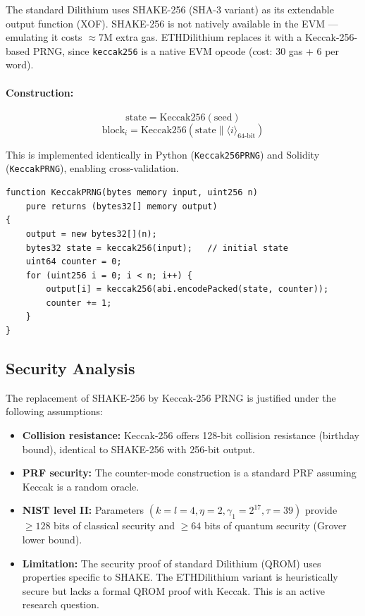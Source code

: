 \documentclass[11pt,a4paper]{article}
\begin{document}
The standard Dilithium uses SHAKE-256 (SHA-3 variant) as its extendable output function (XOF). SHAKE-256 is not natively available in the EVM — emulating it costs $\approx 7$M extra gas. ETHDilithium replaces it with a Keccak-256-based PRNG, since \texttt{keccak256} is a native EVM opcode (cost: 30 gas + 6 per word).

\paragraph{Construction:}
\[
  \text{state} = \text{Keccak256}(\text{seed})
\]
\[
  \text{block}_i = \text{Keccak256}(\text{state} \| \langle i \rangle_{64\text{-bit}})
\]

This is implemented identically in Python (\texttt{Keccak256PRNG}) and Solidity (\texttt{KeccakPRNG}), enabling cross-validation.

\begin{lstlisting}[style=solidity, caption={Solidity KeccakPRNG implementation}]
function KeccakPRNG(bytes memory input, uint256 n)
    pure returns (bytes32[] memory output)
{
    output = new bytes32[](n);
    bytes32 state = keccak256(input);   // initial state
    uint64 counter = 0;
    for (uint256 i = 0; i < n; i++) {
        output[i] = keccak256(abi.encodePacked(state, counter));
        counter += 1;
    }
}
\end{lstlisting}

\subsection{Security Analysis}

\begin{infobox}
The replacement of SHAKE-256 by Keccak-256 PRNG is justified under the following assumptions:
\begin{itemize}
  \item \textbf{Collision resistance:} Keccak-256 offers 128-bit collision resistance (birthday bound), identical to SHAKE-256 with 256-bit output.
  \item \textbf{PRF security:} The counter-mode construction is a standard PRF assuming Keccak is a random oracle.
  \item \textbf{NIST level II:} Parameters $(k=l=4, \eta=2, \gamma_1=2^{17}, \tau=39)$ provide $\geq 128$ bits of classical security and $\geq 64$ bits of quantum security (Grover lower bound).
  \item \textbf{Limitation:} The security proof of standard Dilithium (QROM) uses properties specific to SHAKE. The ETHDilithium variant is heuristically secure but lacks a formal QROM proof with Keccak. This is an active research question.
\end{itemize}
\end{infobox}
\end{document}

